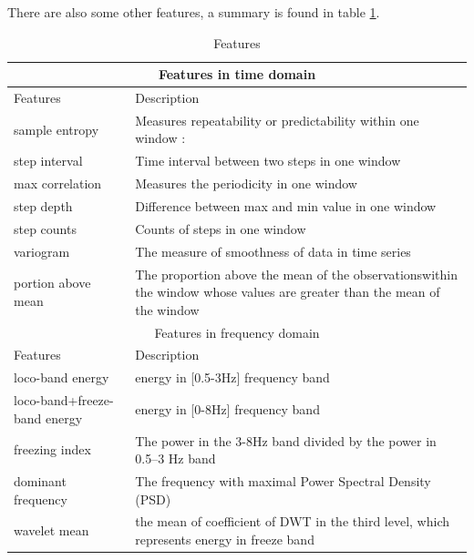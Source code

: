 \documentclass[article]{article}
\begin{document}
 There are also some other features, a summary is found in table \ref{ft}.
\begin{center}
	\begin{table}
	\begin{tabular}{ |p{2cm}||p{6cm}|  }
		\hline
		\multicolumn{2}{|c|}{Features in time domain} \\
		\hline
		Features & Description\\
		\hline
		sample entropy & Measures repeatability or predictability within one window : \\
		\hline
		step interval & Time interval between two steps in one window\\
		\hline
		max correlation & Measures the periodicity in one window\\
		\hline
		step depth & Difference between max and min value in one window\\
		\hline
		step counts & Counts of steps in one window \\
		\hline
		variogram & The measure of smoothness of data in time series \\
		\hline
		portion above mean &The proportion above the mean of the observationswithin the window whose values are greater than
		the mean of the window \\
		
		\hline
		\multicolumn{2}{|c|}{Features in frequency domain}
		\\
		\hline
		Features & Description\\
		\hline
		loco-band energy & energy in [0.5-3Hz] frequency band\\
		\hline
		loco-band+freeze-band energy & energy in [0-8Hz] frequency band \\
		\hline
		freezing index & The power in the 3-8Hz band divided by the power in 0.5–3 Hz band  \\
		\hline
		dominant frequency & The frequency with maximal Power Spectral Density (PSD) \\
		\hline
		wavelet mean & the mean of coefficient of DWT in the third level, which represents energy in freeze band \\
		
		\hline
	\end{tabular}
\label{ft}
\caption{Features}
\end{table}
\end{center}


	


\end{document}
